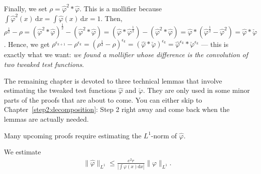 Finally, we set \(\rho = \hat \varphi^2 * \hat \varphi\). This is a mollifier because \(\int \hat \varphi^2(x) \, \mathrm{d}x = \int \hat \varphi(x)  \, \mathrm{d}x = 1\).  Then, \(\rho^{\frac{1}{2}} - \rho = (\hat \varphi^2 * \hat \varphi)^{\frac{1}{2}} - (\hat \varphi^2 * \hat \varphi) = (\hat \varphi * \hat \varphi^{\frac{1}{2}})- (\hat \varphi^2 * \hat \varphi) = \hat \varphi * (\hat \varphi^{\frac{1}{2}} - \hat \varphi^{2}) = \hat \varphi * \check \varphi\). Hence, we get \(\rho^{\epsilon_{k+1}} - \rho^{\epsilon_k} = (\rho^{\frac{1}{2}} - \rho)^{\epsilon_k} = (\hat \varphi * \check \varphi)^{\epsilon_k} = \hat \varphi^{\epsilon_k} * \check \varphi^{\epsilon_k}\) --- this is exactly what we want: \emph{we found a mollifier whose difference is the convolution of two tweaked test functions}.

The remaining chapter is devoted to three technical lemmas that involve estimating the tweaked test functions \(\hat \varphi\) and \(\check \varphi\). They are only used in some minor parts of the proofs that are about to come. You can either skip to Chapter~\ref{step2:decomposition}: Step 2 right away and come back when the lemmas are actually needed.

Many upcoming proofs require estimating the \(L^1\)-norm of \(\hat \varphi\).
\begin{lemma}\label{lemma:tweaked-l1-norm}
We estimate
\begin{align}\label{tweaked-l1-norm}
    \lVert \hat \varphi \rVert_{L^1} \leq \frac{e^2 r}{|\int \varphi(x) \mathrm{d}x |} \lVert \varphi \rVert_{L^1}.
\end{align}
\end{lemma}

